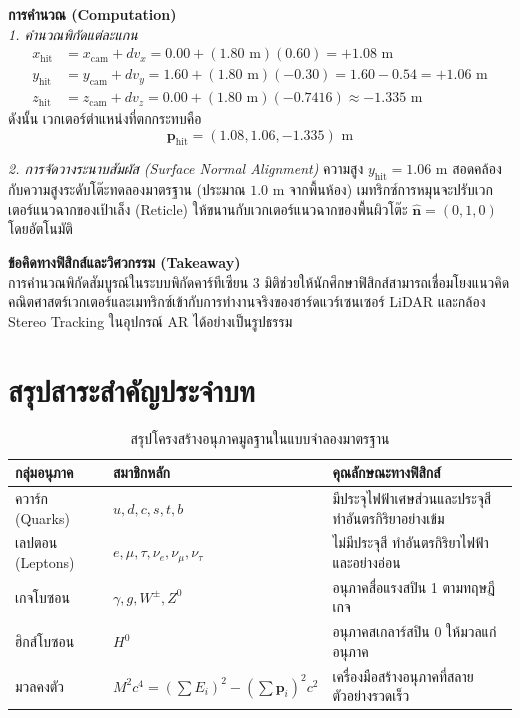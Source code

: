 \begin{psctexample}
\textbf{การคำนวณ (Computation)} \\
\textit{1. คำนวณพิกัดแต่ละแกน}
\begin{align}
x_{\text{hit}} &= x_{\text{cam}} + d v_x = 0.00 + (1.80\text{ m}) (0.60) = +1.08\text{ m} \nonumber \\
y_{\text{hit}} &= y_{\text{cam}} + d v_y = 1.60 + (1.80\text{ m}) (-0.30) = 1.60 - 0.54 = +1.06\text{ m} \nonumber \\
z_{\text{hit}} &= z_{\text{cam}} + d v_z = 0.00 + (1.80\text{ m}) (-0.7416) \approx -1.335\text{ m}
\end{align}
ดังนั้น เวกเตอร์ตำแหน่งที่ตกกระทบคือ
\begin{equation}
\mathbf{p}_{\text{hit}} = (1.08, 1.06, -1.335)\text{ m}
\end{equation}

\textit{2. การจัดวางระนาบสัมผัส (Surface Normal Alignment)}
ความสูง $y_{\text{hit}} = 1.06\text{ m}$ สอดคล้องกับความสูงระดับโต๊ะทดลองมาตรฐาน (ประมาณ $1.0\text{ m}$ จากพื้นห้อง) เมทริกซ์การหมุนจะปรับเวกเตอร์แนวฉากของเป้าเล็ง (Reticle) ให้ขนานกับเวกเตอร์แนวฉากของพื้นผิวโต๊ะ $\hat{\mathbf{n}} = (0, 1, 0)$ โดยอัตโนมัติ

\textbf{ข้อคิดทางฟิสิกส์และวิศวกรรม (Takeaway)} \\
การคำนวณพิกัดสัมบูรณ์ในระบบพิกัดคาร์ทีเซียน 3 มิติช่วยให้นักศึกษาฟิสิกส์สามารถเชื่อมโยงแนวคิดคณิตศาสตร์เวกเตอร์และเมทริกซ์เข้ากับการทำงานจริงของฮาร์ดแวร์เซนเซอร์ LiDAR และกล้อง Stereo Tracking ในอุปกรณ์ AR ได้อย่างเป็นรูปธรรม
\qedexam
\end{psctexample}

\section{สรุปสาระสำคัญประจำบท}

\begin{table}[H]
\centering
\caption{สรุปโครงสร้างอนุภาคมูลฐานในแบบจำลองมาตรฐาน}
\label{tab:standard_model_summary}
\small
\begin{tabularx}{\textwidth}{l >{\centering\arraybackslash}p{4.2cm} Y}
\toprule
\textbf{กลุ่มอนุภาค} & \textbf{สมาชิกหลัก} & \textbf{คุณลักษณะทางฟิสิกส์} \\
\midrule
ควาร์ก (Quarks) & $u, d, c, s, t, b$ & มีประจุไฟฟ้าเศษส่วนและประจุสี ทำอันตรกิริยาอย่างเข้ม \\
เลปตอน (Leptons) & $e, \mu, \tau, \nu_e, \nu_\mu, \nu_\tau$ & ไม่มีประจุสี ทำอันตรกิริยาไฟฟ้าและอย่างอ่อน \\
เกจโบซอน & $\gamma, g, W^\pm, Z^0$ & อนุภาคสื่อแรงสปิน 1 ตามทฤษฎีเกจ \\
ฮิกส์โบซอน & $H^0$ & อนุภาคสเกลาร์สปิน 0 ให้มวลแก่อนุภาค \\
มวลคงตัว & $M^2 c^4 = (\sum E_i)^2 - (\sum \mathbf{p}_i)^2 c^2$ & เครื่องมือสร้างอนุภาคที่สลายตัวอย่างรวดเร็ว \\
\bottomrule
\end{tabularx}
\end{table}

